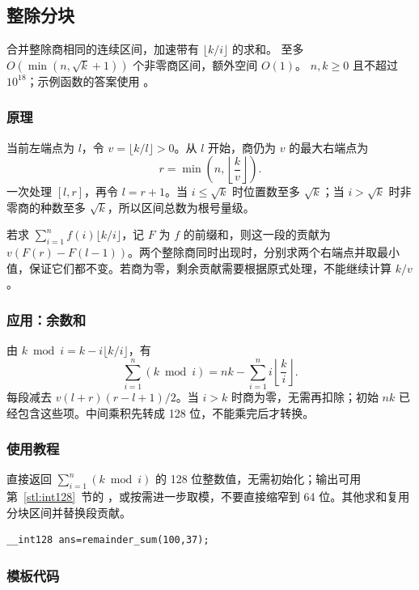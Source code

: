 \subsection{整除分块}
\label{algo:division-blocks}
\AlgorithmInfo
    {合并整除商相同的连续区间，加速带有 $\lfloor k/i\rfloor$ 的求和。}
    {至多 $O(\min(n,\sqrt k+1))$ 个非零商区间，额外空间 $O(1)$。}
    {$n,k\geq0$ 且不超过 $10^{18}$；示例函数的答案使用 。}

\subsubsection*{原理}
当前左端点为 $l$，令 $v=\lfloor k/l\rfloor>0$。从 $l$ 开始，商仍为 $v$ 的最大右端点为
\[
    r=\min\left(n,\left\lfloor\frac{k}{v}\right\rfloor\right).
\]
一次处理 $[l,r]$，再令 $l=r+1$。当 $i\leq\sqrt k$ 时位置数至多 $\sqrt k$；当 $i>\sqrt k$ 时非零商的种数至多 $\sqrt k$，所以区间总数为根号量级。

若求 $\sum_{i=1}^n f(i)\lfloor k/i\rfloor$，记 $F$ 为 $f$ 的前缀和，则这一段的贡献为 $v(F(r)-F(l-1))$。两个整除商同时出现时，分别求两个右端点并取最小值，保证它们都不变。若商为零，剩余贡献需要根据原式处理，不能继续计算 $k/v$。

\subsubsection*{应用：余数和}
由 $k\bmod i=k-i\lfloor k/i\rfloor$，有
\[
    \sum_{i=1}^n(k\bmod i)=nk-
    \sum_{i=1}^n i\left\lfloor\frac ki\right\rfloor.
\]
每段减去 $v(l+r)(r-l+1)/2$。当 $i>k$ 时商为零，无需再扣除；初始 $nk$ 已经包含这些项。中间乘积先转成 128 位，不能乘完后才转换。

\subsubsection*{使用教程}
 直接返回 $\sum_{i=1}^{n}(k\bmod i)$ 的 128 位整数值，无需初始化；输出可用第~\ref{stl:int128}~节的 ，或按需进一步取模，不要直接缩窄到 64 位。其他求和复用分块区间并替换段贡献。
\begin{lstlisting}[style=mtycpp,numbers=none]
__int128 ans=remainder_sum(100,37);
\end{lstlisting}

\subsubsection*{模板代码}
